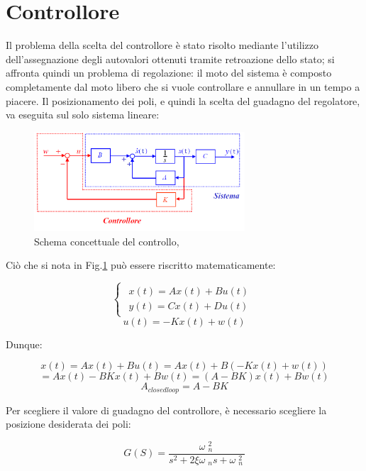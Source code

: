 \section{Controllore}
Il problema della scelta del controllore è stato risolto mediante l'utilizzo dell'assegnazione degli autovalori ottenuti tramite retroazione dello stato; si affronta quindi un problema di regolazione: il moto del sistema è composto completamente dal moto libero che si vuole controllare e annullare in un tempo a piacere. Il posizionamento dei poli, e quindi la scelta del guadagno del regolatore, va eseguita sul solo sistema lineare:
\begin{figure}[H]
	\centering   	
	\includegraphics[width=0.70\textwidth]{Immagini/feedback_state.png}
	\caption{Schema concettuale del controllo,\cite{feedback_state}}
	\label{fig:feedback_state}
\end{figure}
Ciò che si nota in Fig.\ref{fig:feedback_state} può essere riscritto matematicamente:
\begin{center}
	$$
	\begin{cases}
	 \begin{array}{c}
		x\left(t\right)=Ax{\left(t\right)}+Bu\left(t\right)\\
		y{\left(t\right)}=Cx{\left(t\right)}+Du\left(t\right)
	\end{array}
	\end{cases}
	$$
	$$
	u{\left(t\right)}=-Kx{\left(t\right)}+w{\left(t\right)}	
	$$
\end{center}Dunque:
\begin{center}
	
	$$
	x{\left(t\right)}=Ax{\left(t\right)}+Bu{\left(t\right)}=Ax{\left(t\right)}+B{\left(-Kx{\left(t\right)}+w{\left(t\right)}\right)}
	$$
	$$
	=Ax{\left(t\right)}-BKx{\left(t\right)}+Bw\left(t\right)={\left(A-BK\right)}x{\left(t\right)}+Bw{\left(t\right)}
	$$
	$$
	A_{closedloop} =A-BK
	$$
\end{center}
Per scegliere il valore di guadagno del controllore, è necessario scegliere la posizione desiderata dei poli:
\begin{center}
	$$
	G{\left(S\right)}=\frac{\omega {\;}_n^{2\;} }{s^2 +2\xi \omega {\;}_n s+\omega {\;}_n^{2\;} }
	$$
\end{center}
